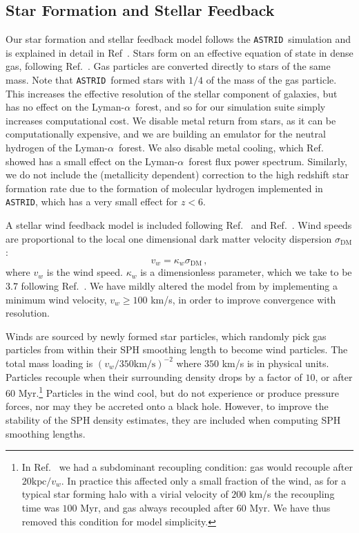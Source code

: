 \documentclass[a4paper,11pt]{article}
\newcommand{\Lya}{Lyman-$\alpha$}
\newcommand{\astrid}{\texttt{ASTRID}}
\begin{document}
\subsection{Star Formation and Stellar Feedback}
\label{sec:stellar}

Our star formation and stellar feedback model follows the \astrid~simulation and is explained in detail in Ref~\cite{Bird:2022}.
Stars form on an effective equation of state in dense gas, following Ref.~\cite{Springel:2003}. Gas particles are converted directly to stars of the same mass. Note that \astrid~formed stars with $1/4$ of the mass of the gas particle. This increases the effective resolution of the stellar component of galaxies, but has no effect on the \Lya~forest, and so for our simulation suite simply increases computational cost. We disable metal return from stars, as it can be computationally expensive, and we are building an emulator for the neutral hydrogen of the \Lya~forest. We also disable metal cooling, which Ref.~\cite{Viel:2013} showed has a small effect on the \Lya~forest flux power spectrum. Similarly, we do not include the (metallicity dependent) correction to the high redshift star formation rate due to the formation of molecular hydrogen implemented in \astrid, which has a very small effect for $z < 6$.

A stellar wind feedback model is included following Ref.~\citep{Okamoto:2010} and Ref.~\cite{Bird:2022}. Wind speeds are proportional to the local one dimensional dark matter velocity dispersion $\sigma_\mathrm{DM}$:
\begin{equation}
v_w = \kappa_w \sigma_\mathrm{DM} \,,
\end{equation}
where $v_w$ is the wind speed. $\kappa_w$ is a dimensionless parameter, which we take to be $3.7$ following Ref.~\cite{Vogelsberger:2013}. We have mildly altered the model from \cite{Bird:2022} by implementing a minimum wind velocity, $v_w \geq 100$ km/s, in order to improve convergence with resolution.

Winds are sourced by newly formed star particles, which randomly pick gas particles from within their SPH smoothing length to become wind particles. The total mass loading is $(v_w/ 350 \mathrm{km/s})^{-2}$ where $350$ km/s is in physical units. Particles recouple when their surrounding density drops by a factor of $10$, or after $60$ Myr.\footnote{In Ref.~\cite{Bird:2022} we had a subdominant recoupling condition: gas would recouple after $20 \mathrm{kpc} / v_w$. In practice this affected only a small fraction of the wind, as for a typical star forming halo with a virial velocity of $200$ km/s the recoupling time was $100$ Myr, and gas always recoupled after $60$ Myr. We have thus removed this condition for model simplicity.} Particles in the wind cool, but do not experience or produce pressure forces, nor may they be accreted onto a black hole. However, to improve the stability of the SPH density estimates, they are included when computing SPH smoothing lengths.
\end{document}
